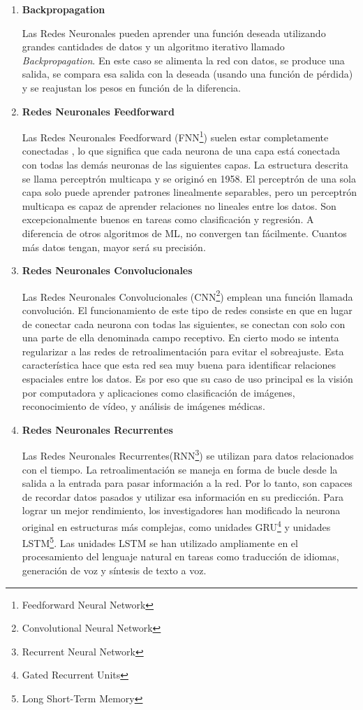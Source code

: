 \begin{enumerate}[label=\textbf{\arabic*})]
	
	\item \textbf{Backpropagation}
	
	Las Redes Neuronales pueden aprender una función deseada utilizando grandes cantidades de datos y un algoritmo iterativo llamado \textit{Backpropagation}.  En este caso se alimenta la red con datos, se produce una salida, se compara esa salida con la deseada (usando una función de pérdida) y se reajustan los pesos en función de la diferencia\cite{Karagiannakos2020}.
	
	\item \textbf{Redes Neuronales Feedforward }
	
	Las Redes Neuronales Feedforward (FNN\footnote{Feedforward Neural Network}) suelen estar completamente conectadas , lo que significa que cada neurona de una capa está conectada con todas las demás neuronas de las siguientes capas. La estructura descrita se llama perceptrón multicapa y se originó en 1958. El perceptrón de una sola capa solo puede aprender patrones linealmente separables, pero un perceptrón multicapa es capaz de aprender relaciones no lineales entre los datos. Son excepcionalmente buenos en tareas como clasificación y regresión. A diferencia de otros algoritmos de ML, no convergen tan fácilmente. Cuantos más datos tengan, mayor será su precisión\cite{Karagiannakos2020}.
	
	\item \textbf{Redes Neuronales Convolucionales}
	
	Las Redes Neuronales Convolucionales (CNN\footnote{Convolutional Neural Network}) emplean una función llamada convolución. El funcionamiento de este tipo de redes consiste en que en lugar de conectar cada neurona con todas las siguientes, se conectan con solo con una parte de ella denominada campo receptivo. En cierto modo se intenta regularizar a las redes de retroalimentación para evitar el sobreajuste. Esta característica hace que esta red sea muy buena para identificar relaciones espaciales entre los datos. Es por eso que su caso de uso principal es la visión por computadora y aplicaciones como clasificación de imágenes, reconocimiento de vídeo, y análisis de imágenes médicas\cite{Karagiannakos2020}.
	
	\item \textbf{Redes Neuronales Recurrentes}
	
	Las Redes Neuronales Recurrentes(RNN\footnote{Recurrent Neural Network}) se utilizan para datos relacionados con el tiempo. La retroalimentación se maneja en forma de bucle desde la salida a la entrada para pasar información a la red. Por lo tanto, son capaces de recordar datos pasados y utilizar esa información en su predicción. Para lograr un mejor rendimiento, los investigadores han modificado la neurona original en estructuras más complejas, como unidades GRU\footnote{Gated Recurrent Units} y unidades LSTM\footnote{Long Short-Term Memory}. Las unidades LSTM se han utilizado ampliamente en el procesamiento del lenguaje natural en tareas como traducción de idiomas, generación de voz y síntesis de texto a voz\cite{Karagiannakos2020}.
	

\end{enumerate}
